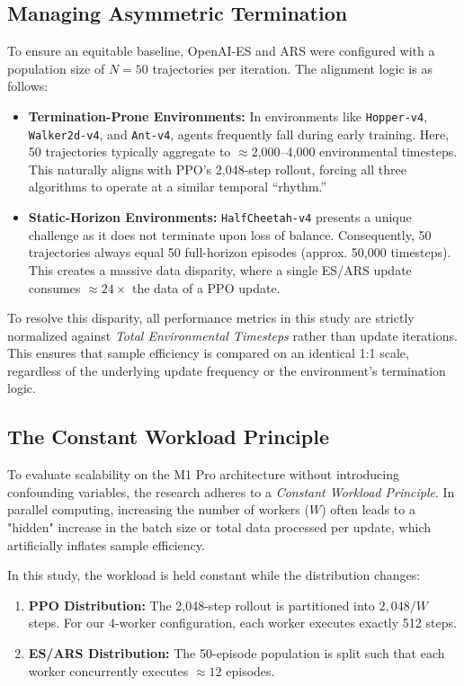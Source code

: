 \subsection{Managing Asymmetric Termination}
To ensure an equitable baseline, OpenAI-ES and ARS were configured with a population size of $N=50$ trajectories per iteration. The alignment logic is as follows:
\begin{itemize}
    \item \textbf{Termination-Prone Environments:} In environments like \texttt{Hopper-v4}, \texttt{Walker2d-v4}, and \texttt{Ant-v4}, agents frequently fall during early training. Here, 50 trajectories typically aggregate to $\approx$2,000--4,000 environmental timesteps. This naturally aligns with PPO’s 2,048-step rollout, forcing all three algorithms to operate at a similar temporal ``rhythm.''
    \item \textbf{Static-Horizon Environments:} \texttt{HalfCheetah-v4} presents a unique challenge as it does not terminate upon loss of balance. Consequently, 50 trajectories always equal 50 full-horizon episodes (approx. 50,000 timesteps). This creates a massive data disparity, where a single ES/ARS update consumes $\approx 24\times$ the data of a PPO update.
\end{itemize}

To resolve this disparity, all performance metrics in this study are strictly normalized against \textit{Total Environmental Timesteps} rather than update iterations. This ensures that sample efficiency is compared on an identical 1:1 scale, regardless of the underlying update frequency or the environment's termination logic.

\subsection{The Constant Workload Principle}
To evaluate scalability on the M1 Pro architecture without introducing confounding variables, the research adheres to a \textit{Constant Workload Principle}. In parallel computing, increasing the number of workers ($W$) often leads to a "hidden" increase in the batch size or total data processed per update, which artificially inflates sample efficiency.

In this study, the workload is held constant while the distribution changes:
\begin{enumerate}
    \item \textbf{PPO Distribution:} The 2,048-step rollout is partitioned into $2,048/W$ steps. For our 4-worker configuration, each worker executes exactly 512 steps.
    \item \textbf{ES/ARS Distribution:} The 50-episode population is split such that each worker concurrently executes $\approx 12$ episodes.
\end{enumerate}

